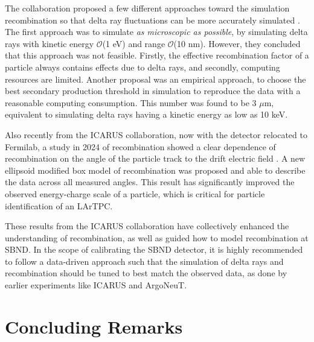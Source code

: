 The collaboration proposed a few different approaches toward the simulation recombination so that delta ray fluctuations can be more accurately simulated \cite{icarus_recomb}. 
The first approach was to simulate \textit{as microscopic as possible}, by simulating delta rays with kinetic energy $\mathcal{O}$(1 eV) and range $\mathcal{O}$(10 nm).
However, they concluded that this approach was not feasible.
Firstly, the effective recombination factor of a particle always contains effects due to delta rays, and secondly, computing resources are limited.
Another proposal was an empirical approach, to choose the best secondary production threshold in simulation to reproduce the data with a reasonable computing consumption.
This number was found to be 3 $\mu$m, equivalent to simulating delta rays having a kinetic energy as low as 10 keV.


Also recently from the ICARUS collaboration, now with the detector relocated to Fermilab, a study in 2024 of recombination showed a clear dependence of recombination on the angle of the particle track to the drift electric field \cite{TODO}.
A new ellipsoid modified box model of recombination was proposed and able to describe the data across all measured angles. 
This result has significantly improved the observed energy-charge scale of a particle, which is critical for particle identification of an LArTPC.   

These results from the ICARUS collaboration have collectively enhanced the understanding of recombination, as well as guided how to model recombination at SBND.
In the scope of calibrating the SBND detector, it is highly recommended to follow a data-driven approach such that the simulation of delta rays and recombination should be tuned to best match the observed data, as done by earlier experiments like ICARUS and ArgoNeuT.

\section{Concluding Remarks}
\label{sec:concludeDeltaRay}

